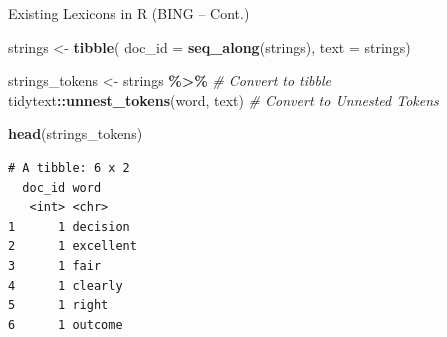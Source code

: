 \documentclass[
  ignorenonframetext,
  aspectratio=169]{beamer}
\newenvironment{Shaded}{\begin{snugshade}}{\end{snugshade}}
\newcommand{\AttributeTok}[1]{\textcolor[rgb]{0.13,0.29,0.53}{#1}}
\newcommand{\CommentTok}[1]{\textcolor[rgb]{0.56,0.35,0.01}{\textit{#1}}}
\newcommand{\FunctionTok}[1]{\textcolor[rgb]{0.13,0.29,0.53}{\textbf{#1}}}
\newcommand{\NormalTok}[1]{#1}
\newcommand{\OtherTok}[1]{\textcolor[rgb]{0.56,0.35,0.01}{#1}}
\newcommand{\SpecialCharTok}[1]{\textcolor[rgb]{0.81,0.36,0.00}{\textbf{#1}}}
\begin{document}
\begin{frame}[fragile]{Existing Lexicons in R (BING -- Cont.)}
\label{existing-lexicons-in-r-bing-cont.-2}
\scriptsize

\begin{Shaded}
\begin{Highlighting}[]
\NormalTok{strings }\OtherTok{\textless{}{-}} \FunctionTok{tibble}\NormalTok{(}
  \AttributeTok{doc\_id =} \FunctionTok{seq\_along}\NormalTok{(strings),}
  \AttributeTok{text =}\NormalTok{ strings) }

\NormalTok{strings\_tokens }\OtherTok{\textless{}{-}}\NormalTok{ strings }\SpecialCharTok{\%\textgreater{}\%} \CommentTok{\# Convert to tibble}
\NormalTok{  tidytext}\SpecialCharTok{::}\FunctionTok{unnest\_tokens}\NormalTok{(word, text) }\CommentTok{\# Convert to Unnested Tokens}

\FunctionTok{head}\NormalTok{(strings\_tokens)}
\end{Highlighting}
\end{Shaded}

\begin{verbatim}
# A tibble: 6 x 2
  doc_id word     
   <int> <chr>    
1      1 decision 
2      1 excellent
3      1 fair     
4      1 clearly  
5      1 right    
6      1 outcome  
\end{verbatim}
\end{frame}
\end{document}
